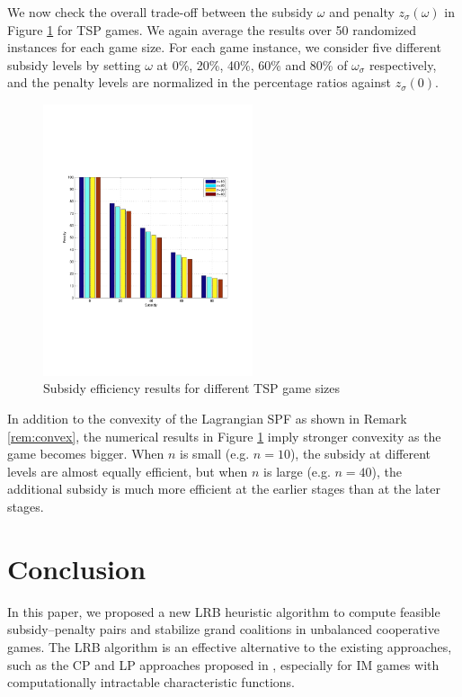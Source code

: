 \documentclass[authoryear,review,12pt]{elsarticle}
\begin{document}
We now check the overall trade-off between the subsidy $\omega$ and penalty $z_{\sigma}(\omega)$ in Figure \ref{figure:differentsize} for TSP games.
We again average the results over 50 randomized instances for each game size.
For each game instance, we consider five different subsidy levels by setting $\omega$ at 0\%, 20\%, 40\%, 60\% and 80\% of $\omega_{\sigma}$ respectively,
and the penalty levels are normalized in the percentage ratios against $z_{\sigma}(0)$.
\begin{figure}[H]
\centering
\includegraphics[width=0.55\textwidth]{DifferentSize1.pdf}
\centering
\caption{\label{figure:differentsize}Subsidy efficiency results for different TSP game sizes}
\end{figure}

In addition to the convexity of the Lagrangian SPF as shown in Remark \ref{rem:convex}, the numerical results in Figure \ref{figure:differentsize} imply stronger convexity as the game becomes bigger.
When $n$ is small (e.g. $n = 10$), the subsidy at different levels are almost equally efficient, but when $n$ is large (e.g. $n = 40$), the additional subsidy is much more efficient at the earlier stages than at the later stages.





\section{Conclusion}\label{section:conclusion}
In this paper, we proposed a new LRB heuristic algorithm to compute feasible subsidy--penalty pairs and stabilize grand coalitions in unbalanced cooperative games.
The LRB algorithm is an effective alternative to the existing approaches, such as the CP and LP approaches proposed in \cite{leastcore2018}, especially for IM games with computationally intractable characteristic functions.
\end{document}
